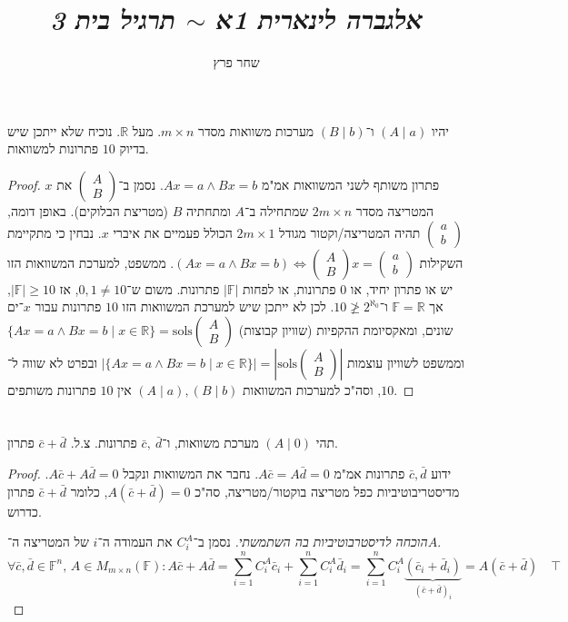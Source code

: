 \documentclass[]{article}
\author{שחר פרץ}
\title{\textit{אלגברה לינארית 1א $\sim$ תרגיל בית 3}}
\newcommand\R     {\mathbb{R}}
\newcommand\taz   {2^{\aleph_0}}
\newcommand\F         {\mathbb{F}}
\newcommand\co        {\colon}
\newcommand\pms[1]    {\begin{pmatrix}
		#1
\end{pmatrix}}
\newcommand\sof[1]    {\left | #1 \right |}
\theoremstyle{definition}
\begin{document}
	\maketitle
	\section{}
	יהיו $(A \mid a)$ ו־$(B \mid b)$ מערכות משוואות מסדר $m \times n$. מעל $\R$. נוכיח שלא ייתכן שיש בדיוק $10$ פתרונות למשוואות. 
	\begin{proof}
		$x$ פתרון משותף לשני המשוואות אמ"מ $Ax = a \land Bx = b$. נסמן ב־$\pms{A \\ B}$ את המטריצה מסדר $2m \times n$ שמתחילה ב־$A$ ומתחתיה $B$ (מטריצת הבלוקים). באופן דומה, $\pms{a \\ b}$ תהיה המטריצה/וקטור מגודל $2m \times 1$ הכולל פעמיים את איברי $x$. נבחין כי מתקיימת השקילות $(Ax = a \land Bx = b) \iff \pms{A \\ B}x = \pms{a \\ b}$. ממשפט, למערכת המשוואות הזו יש או פתרון יחיד, או $0$ פתרונות, או לפחות $|\F|$ פתרונות. משום ש־$0, 1 \neq 10$, אז $|\F| \ge 10$, אך $\F = \R$ ו־$10 \not\ge \taz$. לכן לא ייתכן שיש למערכת המשוואות הזו $10$ פתרונות עבור $x$־ים שונים, ומאקסיומת ההקפיות (שוויון קבוצות) $\{Ax = a \land Bx = b \mid x \in \R\} = \mathrm{sols}\pms{A \\ B}$ וממשפט לשוויון עוצמות $|\{Ax = a \land Bx = b \mid x \in \R\}| = \sof{\mathrm{sols}\pms{A\\ B}} $ ובפרט לא שווה ל־$10$, וסה"כ למערכות המשוואות $(A \mid a), (B \mid b)$ אין $10$ פתרונות משותפים. 
	\end{proof}
	\section{}
	
	תהי $(A \mid 0)$ מערכת משוואות, ו־$\bar c, \ \bar d$ פתרונות. צ.ל. $\bar c + \bar d$ פתרון. \begin{proof}
		ידוע $\bar c, \bar d$ פתרונות אמ"מ $A \bar c = A \bar d = 0$. נחבר את המשוואות ונקבל $A \bar c + A \bar d = 0$. מדיסטריבוטיביות כפל מטריצה בוקטור/מטריצה, סה"כ $A(\bar c + \bar d) = 0$, כלומר $\bar c + \bar d$ פתרון כדרוש. 
		
		\textit{הוכחה לדיסטרבוטיביות בה השתמשתי. }נסמן ב־$C_i^A$ את העמודה ה־$i$ של המטריצה ה־$A$. 
		\[ \forall \bar c, \bar d \in \F^n,\, A \in M_{m \times n}(\F) \co A\bar c + A \bar d = \sum_{i = 1}^{n}C_i^A\bar c_i + \sum_{i = 1}^{n}C_i^A\bar d_i = \sum_{i = 1}^{n}C_i^A\underbrace{(\bar c_i + \bar d_i)}_{(\bar c + \bar d)_i} = A(\bar c + \bar d) \quad \top \]
	\end{proof}
	
\end{document}
